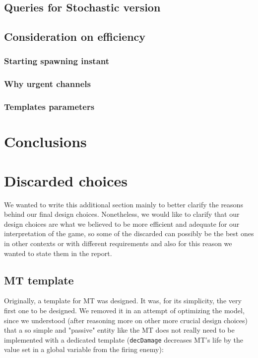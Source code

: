\documentclass[
10pt, %
a4paper, %
oneside, %
headinclude,footinclude, %
BCOR5mm, %
]{scrartcl}
\begin{document}
	\subsection{Queries for Stochastic version}
	\subsection{Consideration on efficiency}
	\subsubsection{Starting spawning instant}
	\subsubsection{Why urgent channels}
	\subsubsection{Templates parameters}
	
	
	\section{Conclusions}

	
	
	\newpage
	\appendix
	\section{Discarded choices}
		We wanted to write this additional section mainly to better clarify the reasons behind our final design choices. Nonetheless, we would like to clarify that our design choices are what we believed to be more efficient and adequate for our interpretation of the game, so some of the discarded can possibly be the best ones in other contexts or with different requirements and also for this reason we wanted to state them in the report.
		\subsection{MT template}
			Originally, a template for MT was designed. It was, for its simplicity, the very first one to be designed. We removed it in an attempt of optimizing the model, since we understood (after reasoning more on other more crucial design choices) that a so simple and "passive" entity like the MT does not really need to be implemented with a dedicated template (\texttt{decDamage} decreases MT's life by the value set in a global variable from the firing enemy):
			
\end{document}
